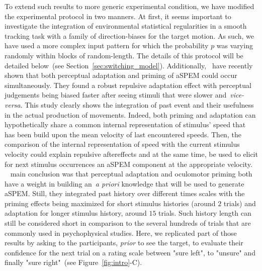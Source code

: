 \documentclass[profile,final,english, draft]{article}%
\newcommand{\citet}[1]{\textcite{#1}}
\newcommand{\seeFig}[1]{see Figure~\ref{fig:#1}}
\newcommand{\seeSec}[1]{see Section~\ref{sec:#1}}
\begin{document}
To extend such results to more generic experimental condition,
we have modified the experimental protocol in two manners.
At first, it seems important to investigate the integration of environmental statistical regularities
in a smooth tracking task with
a family of direction-biases for the target motion.
As such, we have used a more complex input pattern 
for which the probability $p$ was varying randomly
within blocks of random-length.
The details of this protocol will be detailed below~(\seeSec{switching_model}).
Additionally,~\citet{Maus2015} have recently shown that
both perceptual adaptation and priming of aSPEM could occur simultaneously.
They found a robust repulsive adaptation effect
with perceptual judgements being biased faster
after seeing stimuli that were slower and~\textit{vice-versa}.
This study clearly shows the integration of past event and
their usefulness in the actual production of movements.
Indeed, both priming and adaptation can hypothetically share
a common internal representation of stimulus' speed
that has been build upon the mean velocity of last encountered speeds.
Then, the comparison of the internal representation of speed
with the current stimulus velocity could explain repulsive aftereffects and
at the same time, be used to elicit for next stimulus occurrences
an aSPEM component at the appropriate velocity.
~\citet{Maus2015} main conclusion was that
perceptual adaptation and oculomotor priming
both have a weight in building an~\textit{a priori} knowledge
that will be used to generate aSPEM.
Still, they integrated past history over different times scales
with the priming effects being maximized
for short stimulus histories (around $2$ trials) and
adaptation for longer stimulus history, around $15$ trials.
Such history length can still be considered
short in comparison to the several hundreds 
of trials that are commonly used in psychophysical studies.
Here, we replicated part of those results
by asking to the participants,
\emph{prior} to see the target, 
to evaluate their confidence for the next trial on a rating scale 
between "sure left", to "unsure" and finally "sure right"~(\seeFig{intro}-C).
\end{document}
